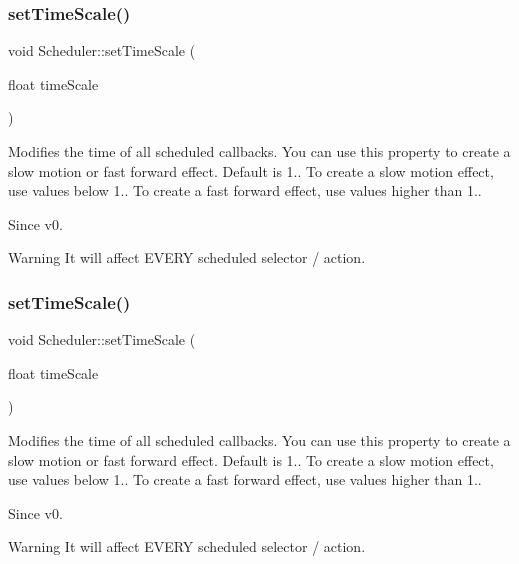 \subsubsection{\texorpdfstring{set\+Time\+Scale()}{setTimeScale()}\hspace{0.1cm}{\footnotesize\ttfamily [1/2]}}
{\footnotesize\ttfamily void Scheduler\+::set\+Time\+Scale (\begin{DoxyParamCaption}\item[{float}]{time\+Scale }\end{DoxyParamCaption})\hspace{0.3cm}{\ttfamily [inline]}}

Modifies the time of all scheduled callbacks. You can use this property to create a \textquotesingle{}slow motion\textquotesingle{} or \textquotesingle{}fast forward\textquotesingle{} effect. Default is 1.. To create a \textquotesingle{}slow motion\textquotesingle{} effect, use values below 1.. To create a \textquotesingle{}fast forward\textquotesingle{} effect, use values higher than 1.. \begin{DoxySince}{Since}
v0. 
\end{DoxySince}
\begin{DoxyWarning}{Warning}
It will affect E\+V\+E\+RY scheduled selector / action. 
\end{DoxyWarning}
\mbox{\label{classScheduler_a7aeaef587604d3a1f20ebac7a12b1d77}} 
\subsubsection{\texorpdfstring{set\+Time\+Scale()}{setTimeScale()}\hspace{0.1cm}{\footnotesize\ttfamily [2/2]}}
{\footnotesize\ttfamily void Scheduler\+::set\+Time\+Scale (\begin{DoxyParamCaption}\item[{float}]{time\+Scale }\end{DoxyParamCaption})\hspace{0.3cm}{\ttfamily [inline]}}

Modifies the time of all scheduled callbacks. You can use this property to create a \textquotesingle{}slow motion\textquotesingle{} or \textquotesingle{}fast forward\textquotesingle{} effect. Default is 1.. To create a \textquotesingle{}slow motion\textquotesingle{} effect, use values below 1.. To create a \textquotesingle{}fast forward\textquotesingle{} effect, use values higher than 1.. \begin{DoxySince}{Since}
v0. 
\end{DoxySince}
\begin{DoxyWarning}{Warning}
It will affect E\+V\+E\+RY scheduled selector / action. 
\end{DoxyWarning}
\mbox{\label{classScheduler_a3ca194b9ca146d9c522cc2c54a6d4ede}} 
